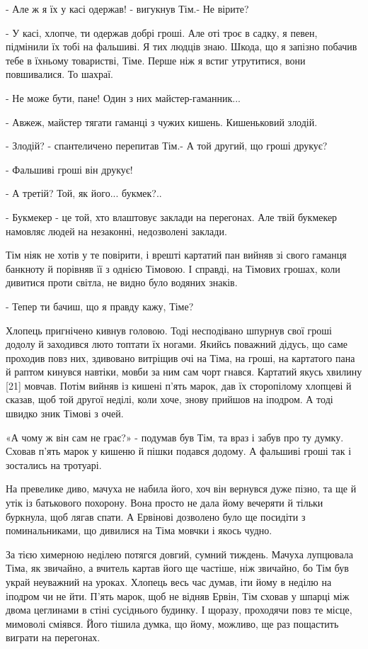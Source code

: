 - Але ж я їх у касі одержав! - вигукнув Тім.- Не вірите?

- У касі, хлопче, ти одержав добрі гроші. Але оті троє в садку, я певен, підмінили їх тобі на фальшиві. Я тих людців знаю. Шкода, що я запізно побачив тебе в їхньому товаристві, Тіме. Перше ніж я встиг утрутитися, вони повшивалися. То шахраї.

- Не може бути, пане! Один з них майстер-гаманник...

- Авжеж, майстер тягати гаманці з чужих кишень. Кишеньковий злодій.

- Злодій? - спантеличено перепитав Тім.- А той другий, що гроші друкує?

- Фальшиві гроші він друкує!

- А третій? Той, як його... букмек?..

- Букмекер - це той, хто влаштовує заклади на перегонах. Але твій букмекер намовляє людей на незаконні, недозволені заклади.

Тім ніяк не хотів у те повірити, і врешті картатий пан вийняв зі свого гаманця банкноту й порівняв її з однією Тімовою. І справді, на Тімових грошах, коли дивитися проти світла, не видно було водяних знаків.

- Тепер ти бачиш, що я правду кажу, Тіме?

Хлопець пригнічено кивнув головою. Тоді несподівано шпурнув свої гроші додолу й заходився люто топтати їх ногами. Якийсь поважний дідусь, що саме проходив повз них, здивовано витріщив очі на Тіма, на гроші, на картатого пана й раптом кинувся навтіки, мовби за ним сам чорт гнався. Картатий якусь хвилину [21] мовчав. Потім вийняв із кишені п'ять марок, дав їх сторопілому хлопцеві й сказав, щоб той другої неділі, коли хоче, знову прийшов на іподром. А тоді швидко зник Тімові з очей.

«А чому ж він сам не грає?» - подумав був Тім, та враз і забув про ту думку. Сховав п'ять марок у кишеню й пішки подався додому. А фальшиві гроші так і зостались на тротуарі.

На превелике диво, мачуха не набила його, хоч він вернувся дуже пізно, та ще й утік із батькового похорону. Вона просто не дала йому вечеряти й тільки буркнула, щоб лягав спати. А Ервінові дозволено було ще посидіти з поминальниками, що дивилися на Тіма мовчки і якось чудно.

За тією химерною неділею потягся довгий, сумний тиждень. Мачуха лупцювала Тіма, як звичайно, а вчитель картав його ще частіше, ніж звичайно, бо Тім був украй неуважний на уроках. Хлопець весь час думав, іти йому в неділю на іподром чи не йти. П'ять марок, щоб не відняв Ервін, Тім сховав у шпарці між двома цеглинами в стіні сусіднього будинку. І щоразу, проходячи повз те місце, мимоволі сміявся. Його тішила думка, що йому, можливо, ще раз пощастить виграти на перегонах.

